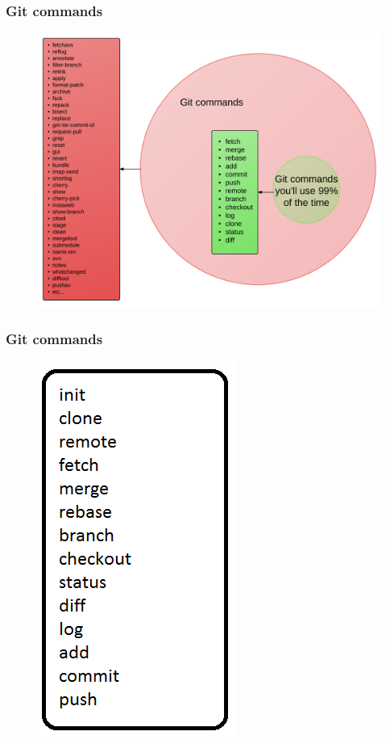 \documentclass{beamer}
\begin{document}
\begin{frame}
    \frametitle{Git commands}
    \begin{figure}[h!]
        \begin{center}
            \includegraphics[scale=0.09]{git_commands2.png}
        \end{center}
    \end{figure}
\end{frame}

\begin{frame}
    \frametitle{Git commands}
    \begin{figure}[h!]
        \begin{center}
            \includegraphics[scale=0.6]{commands.png}
        \end{center}
    \end{figure}
\end{frame}
\end{document}
